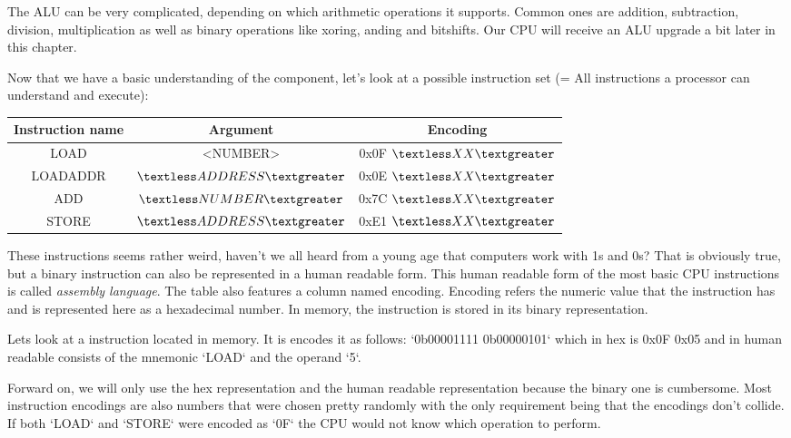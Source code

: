 The ALU can be very complicated, depending on which arithmetic operations it supports. Common
ones are addition, subtraction, division, multiplication as well as binary operations like
xoring, anding and bitshifts. Our CPU will receive an ALU upgrade a bit later in this chapter.



Now that we have a basic understanding of the component, let's look at a possible instruction set
(= All instructions a processor can understand and execute):

\begin{center}
	\begin{tabular} { | c | c | c | }
	        Instruction name & Argument & Encoding \\
	        \hline
	        LOAD & \textless NUMBER\textgreater & 0x0F $\textless XX\textgreater$  \\
	        LOADADDR & $\textless ADDRESS\textgreater$ & 0x0E $\textless XX\textgreater$  \\
	        ADD & $\textless NUMBER\textgreater$ & 0x7C $\textless XX\textgreater$  \\
	        STORE & $\textless ADDRESS\textgreater$ & 0xE1 $\textless XX\textgreater$ 
	\end{tabular}
\end{center}


These instructions seems rather weird, haven't we all heard from a young age that
computers work with 1s and 0s? That is obviously true, but a binary instruction
can also be represented in a human readable form. This human readable form of the
most basic CPU instructions is called \textit{assembly language}. The table also features
a column named encoding. Encoding refers the numeric value that the instruction has
and is represented here as a hexadecimal number. In memory, the instruction is 
stored in its binary representation.

Lets look at a instruction located in memory. It is encodes it as follows: `0b00001111 0b00000101`
which in hex is 0x0F 0x05 and in human readable consists of the mnemonic
`LOAD` and the operand `5`.

Forward on, we will only use the hex representation and the human readable representation
because the binary one is cumbersome. Most instruction encodings are also numbers that were
chosen pretty randomly with the only requirement being that the encodings don't collide.
If both `LOAD` and `STORE` were encoded as `0F` the CPU would not know which operation to
perform.

